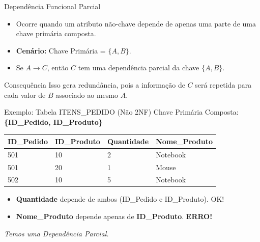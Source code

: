 \documentclass[9pt]{beamer}
\begin{document}
\begin{frame}{Dependência Funcional Parcial}
  \begin{itemize}
    \item Ocorre quando um atributo não-chave depende de apenas uma parte de uma chave primária composta.
    \item \textbf{Cenário:} Chave Primária = $\{A, B\}$.
    \item Se $A \to C$, então $C$ tem uma dependência parcial da chave $\{A, B\}$.
  \end{itemize}
  \vspace{0.4cm}
  \begin{alertblock}{Consequência}
    Isso gera redundância, pois a informação de $C$ será repetida para cada valor de $B$ associado ao mesmo $A$.
  \end{alertblock}
\end{frame}

\begin{frame}{Exemplo: Tabela ITENS\_PEDIDO (Não 2NF)}
  \small
  Chave Primária Composta: \textbf{\{ID\_Pedido, ID\_Produto\}}
  \vspace{0.3cm}
  \centering
  \begin{tabular}{|l|l|l|l|}
    \hline
    \textbf{ID\_Pedido} & \textbf{ID\_Produto} & \textbf{Quantidade} & \textbf{Nome\_Produto} \\ \hline
    501 & 10 & 2 & Notebook \\ \hline
    501 & 20 & 1 & Mouse \\ \hline
    502 & 10 & 5 & \color{red}Notebook \\ \hline
  \end{tabular}
  \vspace{0.4cm}
  \begin{itemize}
    \item \textbf{Quantidade} depende de ambos (ID\_Pedido e ID\_Produto). OK!
    \item \textbf{Nome\_Produto} depende apenas de \textbf{ID\_Produto}. \textbf{ERRO!}
  \end{itemize}
  \textit{Temos uma Dependência Parcial.}
\end{frame}
\end{document}
